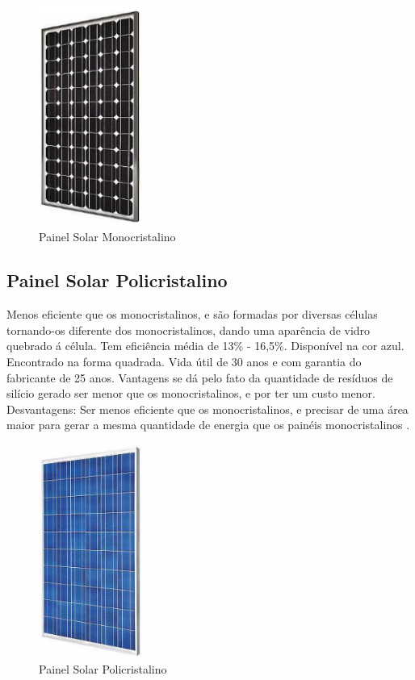 \begin{figure}[!h]
\centering
\includegraphics[width=0.3\textwidth]{figuras/placa.png}
\caption{Painel Solar Monocristalino}
\label{fig:placa}
\end{figure}

\subsection{Painel Solar Policristalino}

Menos eficiente que os monocristalinos, e são formadas por diversas células tornando-os diferente dos monocristalinos, dando uma aparência de vidro quebrado á célula. Tem eficiência média de 13\% - 16,5\%. Disponível na cor azul. Encontrado na forma quadrada. Vida útil de 30 anos e com garantia do fabricante de 25 anos. Vantagens se dá pelo fato da quantidade de resíduos de silício gerado ser menor que os monocristalinos, e por ter um custo menor. Desvantagens: Ser menos eficiente que os monocristalinos, e precisar de uma área maior para gerar a mesma quantidade de energia que os painéis monocristalinos \cite{neosolar}.

\begin{figure}[!h]
\centering
\includegraphics[width=0.3\textwidth]{figuras/painel.png}
\caption{Painel Solar Policristalino}
\label{fig:painel}
\end{figure}

